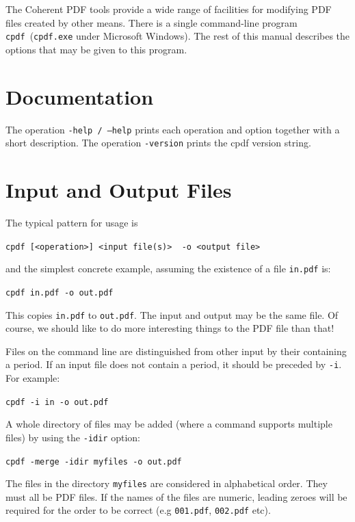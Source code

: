 \documentclass{book}
\newcommand{\cpdf}{\texttt{cpdf}}
\begin{document}
  The Coherent PDF tools provide a wide range of facilities for modifying PDF
files created by other means. There is a single command-line program
\cpdf\ (\texttt{cpdf.exe} under Microsoft Windows). The rest of this manual describes the options that may be given
to this program.

\section{Documentation}

The operation \texttt{-help / --help} prints each operation and option together with a short description. The operation \texttt{-version} prints the cpdf version string.

   
  \section{Input and Output Files}
  The typical pattern for usage is
  \begin{framed}
  \noindent\small\verb!cpdf [<operation>] <input file(s)>  -o <output file>!
  \end{framed}
  \noindent and the simplest concrete example, assuming the existence of a file
\texttt{in.pdf} is:
  \begin{framed}
  \noindent\small\verb!cpdf in.pdf -o out.pdf!
  \end{framed}
  \noindent This copies \texttt{in.pdf} to \texttt{out.pdf}. The input and
output may be the same file. Of course, we should like to do more interesting
things to the PDF file than that!

  Files on the command line are distinguished from other input by their
containing a period. If an input file does not contain a period, it should be
preceded by \verb!-i!. For example:

  \begin{framed}
  \noindent\small\verb!cpdf -i in -o out.pdf!
  \end{framed}
\noindent A whole directory of files may be added (where a command supports multiple files) by using the \verb!-idir! option:
  \begin{framed}
  \noindent\small\verb!cpdf -merge -idir myfiles -o out.pdf!
  \end{framed}
  \noindent The files in the directory \verb!myfiles! are considered in alphabetical order. They must all be PDF files. If the names of the files are numeric, leading zeroes will be required for the order to be correct (e.g \verb!001.pdf!, \verb!002.pdf! etc).
\end{document}
